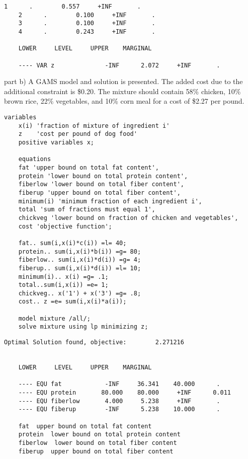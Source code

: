 \begin{enumerate}
\begin{solution}
\begin{Verbatim}[samepage=true]
	1      .        0.557     +INF       .         
	2      .        0.100     +INF       .         
	3      .        0.100     +INF       .         
	4      .        0.243     +INF       .         
	
	LOWER     LEVEL     UPPER    MARGINAL
	
	---- VAR z              -INF      2.072     +INF       .         
	\end{Verbatim}
	
	part b) A GAMS model and solution is presented. The added cost due to the additional constraint is \$0.20. The mixture should contain 58\% chicken, 10\% brown rice, 22\% vegetables, and 10\% corn meal for a cost of \$2.27 per pound.
	\begin{Verbatim}[samepage=true]
	variables
	x(i) 'fraction of mixture of ingredient i'
	z    'cost per pound of dog food'
	positive variables x;
	
	equations
	fat 'upper bound on total fat content',
	protein 'lower bound on total protein content',
	fiberlow 'lower bound on total fiber content',
	fiberup 'upper bound on total fiber content',
	minimum(i) 'minimum fraction of each ingredient i',
	total 'sum of fractions must equal 1',
	chickveg 'lower bound on fraction of chicken and vegetables',
	cost 'objective function';
	
	fat.. sum(i,x(i)*c(i)) =l= 40;
	protein.. sum(i,x(i)*b(i)) =g= 80;
	fiberlow.. sum(i,x(i)*d(i)) =g= 4;
	fiberup.. sum(i,x(i)*d(i)) =l= 10;
	minimum(i).. x(i) =g= .1;
	total..sum(i,x(i)) =e= 1;
	chickveg.. x('1') + x('3') =g= .8;
	cost.. z =e= sum(i,x(i)*a(i));
	
	model mixture /all/;
	solve mixture using lp minimizing z;
	\end{Verbatim}
	
	\begin{Verbatim}[samepage=true]
	Optimal Solution found, objective:        2.271216
	
	
	LOWER     LEVEL     UPPER    MARGINAL
	
	---- EQU fat            -INF     36.341    40.000      .         
	---- EQU protein       80.000    80.000     +INF      0.011      
	---- EQU fiberlow       4.000     5.238     +INF       .         
	---- EQU fiberup        -INF      5.238    10.000      .         
	
	fat  upper bound on total fat content
	protein  lower bound on total protein content
	fiberlow  lower bound on total fiber content
	fiberup  upper bound on total fiber content
	

\end{Verbatim}
\end{solution}
\end{enumerate}
